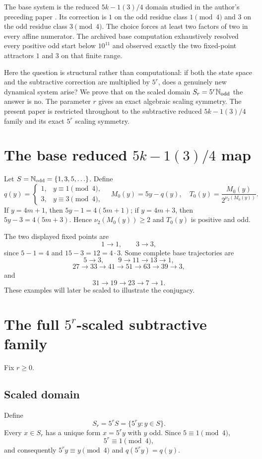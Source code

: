 \documentclass[11pt]{article}
\theoremstyle{remark}\newtheorem{remark}{Remark}
\newcommand{\Nodd}{\mathbb{N}_{\rm odd}}
\begin{document}
The base system is the reduced $5k-1(3)/4$ domain studied in the author's preceding paper \cite{BaseMinus}.  Its correction is $1$ on the odd residue class $1\pmod4$ and $3$ on the odd residue class $3\pmod4$.  The choice forces at least two factors of two in every affine numerator.  The archived base computation exhaustively resolved every positive odd start below $10^{11}$ and observed exactly the two fixed-point attractors $1$ and $3$ on that finite range.

Here the question is structural rather than computational: if both the state space and the subtractive correction are multiplied by $5^r$, does a genuinely new dynamical system arise?  We prove that on the scaled domain $S_r=5^r\Nodd$ the answer is no.  The parameter $r$ gives an exact algebraic scaling symmetry.  The present paper is restricted throughout to the subtractive reduced $5k-1(3)/4$ family and its exact $5^r$ scaling symmetry.

\section{The base reduced $5k-1(3)/4$ map}
Let $S=\Nodd=\{1,3,5,\ldots\}$. Define
\[
q(y)=\begin{cases}1,&y\equiv1\pmod4,\\3,&y\equiv3\pmod4,\end{cases}
\quad M_0(y)=5y-q(y),\quad
T_0(y)=\frac{M_0(y)}{2^{\nu_2(M_0(y))}}.
\]
If $y=4m+1$, then $5y-1=4(5m+1)$; if $y=4m+3$, then $5y-3=4(5m+3)$. Hence $\nu_2(M_0(y))\ge2$ and $T_0(y)$ is positive and odd.

The two displayed fixed points are
\[
1\to1,\qquad3\to3,
\]
since $5-1=4$ and $15-3=12=4\cdot3$.  Some complete base trajectories are
\[
5\to3,\qquad 9\to11\to13\to1,
\]
\[
27\to33\to41\to51\to63\to39\to3,
\]
and
\[
31\to19\to23\to7\to1.
\]
These examples will later be scaled to illustrate the conjugacy.

\section{The full $5^r$-scaled subtractive family}
Fix $r\ge0$.
\subsection{Scaled domain}
Define
\[
S_r=5^rS=\{5^r y:y\in S\}.
\]
Every $x\in S_r$ has a unique form $x=5^r y$ with $y$ odd. Since $5\equiv1\pmod4$,
\[
5^r\equiv1\pmod4,
\]
and consequently $5^r y\equiv y\pmod4$ and $q(5^r y)=q(y)$.
\end{document}
